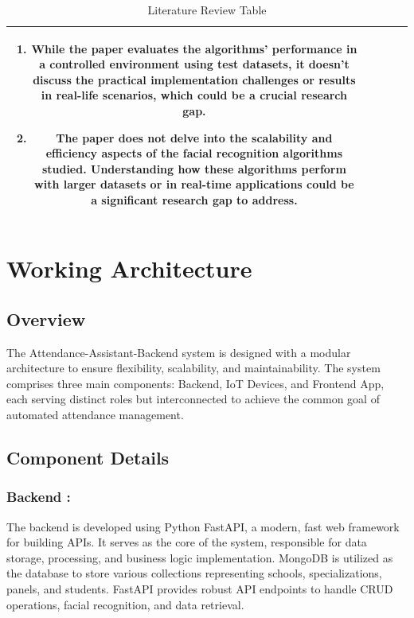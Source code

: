 \documentclass[conference]{IEEEtran}
\begin{document}
\begin{table}[]
\begin{tabular}{|c|c|c|c|c|}
\begin{minipage}[t]{0.3\textwidth}
\begin{enumerate}
                \item While the paper evaluates the algorithms' performance in a controlled environment using test datasets, it doesn't discuss the practical implementation challenges or results in real-life scenarios, which could be a crucial research gap.

                \item The paper does not delve into the scalability and efficiency aspects of the facial recognition algorithms studied. Understanding how these algorithms perform with larger datasets or in real-time applications could be a significant research gap to address.
            \end{enumerate}
        \end{minipage}                                                                                                                                                                                                                                                                             \\ \hline
    \end{tabular}
    \caption{Literature Review Table}
    \label{tab:my-table}
\end{table}

\section{Working Architecture}

\subsection{Overview}

The Attendance-Assistant-Backend system is designed with a modular architecture to ensure flexibility, scalability, and maintainability. The system comprises three main components: Backend, IoT Devices, and Frontend App, each serving distinct roles but interconnected to achieve the common goal of automated attendance management.

\subsection{Component Details}
\subsubsection{\textbf{Backend :}}
The backend is developed using Python FastAPI, a modern, fast web framework for building APIs. It serves as the core of the system, responsible for data storage, processing, and business logic implementation. MongoDB is utilized as the database to store various collections representing schools, specializations, panels, and students. FastAPI provides robust API endpoints to handle CRUD operations, facial recognition, and data retrieval.
\end{document}

